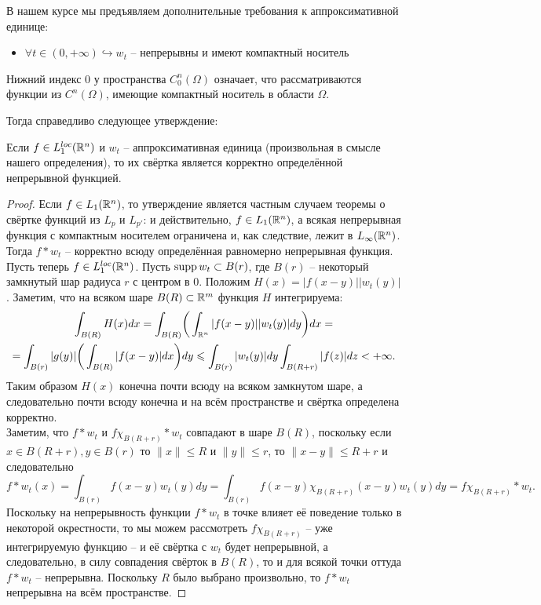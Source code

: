 \begin{note}
	В нашем курсе мы предъявляем дополнительные требования к аппроксимативной единице:
	\begin{itemize}
		\item $\forall t \in (0, +\infty) \hookrightarrow w_t$ -- непрерывны и имеют компактный носитель
	\end{itemize}
    \begin{definition}
        Нижний индекс $0$ у пространства $C_0^n(\Omega)$ означает, что рассматриваются функции из $C^n(\Omega)$, имеющие компактный носитель в области $\Omega$. 
    \end{definition}
    
	Тогда справедливо следующее утверждение:
	\begin{theorem}
		Если $f \in L_1^{loc}(\mathbb{R}^n)$ и $w_t$ -- аппроксимативная единица (произвольная в смысле нашего определения), то их свёртка является корректно определённой непрерывной функцией.
	\end{theorem}
	\begin{proof}
		Если $f \in L_1(\mathbb{R}^n)$, то утверждение является частным случаем теоремы о свёртке функций из $L_p$ и $L_{p'}$: и действительно, $f \in L_1(\mathbb{R}^n)$, а всякая непрерывная функция с компактным носителем ограничена и, как следствие, лежит в $L_{\infty}(\mathbb{R}^n)$.
		Тогда $f * w_t$ -- корректно всюду определённая равномерно непрерывная функция. \\
		Пусть теперь $f \in L_1^{loc}(\mathbb{R}^n)$.
		Пусть $\operatorname{supp} w_t \subset B(r)$, где $B(r)$ -- некоторый замкнутый шар радиуса $r$ с центром в 0.
		Положим $H(x) = |f(x - y)||w_t(y)|$.
		Заметим, что на всяком шаре $B(R) \subset \mathbb{R}^{m}$ функция $H$ интегрируема:
		\begin{multline*}
			\int_{B(R)} H(x)dx = \int_{B(R)} \biggr(\int_{\mathbb{R}^n}|f(x - y)||w_t(y)|dy\biggr)dx = \\ = \int_{B(r)} |g(y)| \biggr(\int_{B(R)} |f(x - y)|dx \biggr) dy \leqslant \int_{B(r)} |w_t(y)|dy \int_{B(R + r)} |f(z)|dz < +\infty.
		\end{multline*}
		Таким образом $H(x)$ конечна почти всюду на всяком замкнутом шаре, а следовательно почти всюду конечна и на всём пространстве и свёртка определена корректно. \\
		Заметим, что $f * w_t$ и $f\chi_{B(R + r)} * w_t$ совпадают в шаре $B(R)$, поскольку если $x \in B(R + r), y \in B(r)$ то $\|x\| \leq R$ и $\|y\| \leq r$, то $\|x - y\| \leq R + r$ и следовательно
		\[
		f * w_t(x) = \int_{B(r)} f(x - y)w_t(y)dy = \int_{B(r)} f(x - y)\chi_{B(R + r)}(x - y)w_t(y)dy = f\chi_{B(R + r)} * w_t.
		\]
		Поскольку на непрерывность функции $f * w_t$ в точке влияет её поведение только в некоторой окрестности, то мы можем рассмотреть $f\chi_{B(R + r)}$ -- уже интегрируемую функцию -- и её свёртка с $w_t$ будет непрерывной, а следовательно, в силу совпадения свёрток в $B(R)$, то и для всякой точки оттуда $f * w_t$ -- непрерывна.
		Поскольку $R$ было выбрано произвольно, то $f * w_t$ непрерывна на всём пространстве.
	\end{proof}
\end{note}


